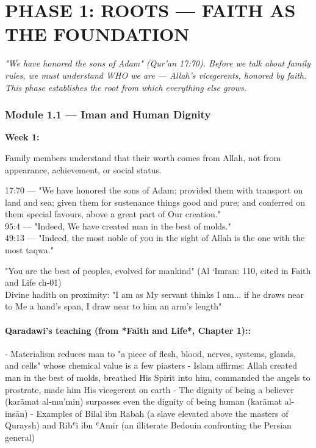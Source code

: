 \documentclass[11pt,a4paper]{article}
\begin{document}
\vspace{6pt}\noindent{\color{border}\rule{\textwidth}{0.5pt}}\vspace{6pt}

\newpage
\section{PHASE 1: ROOTS --- FAITH AS THE FOUNDATION}

\begin{quotebox}\itshape "We have honored the sons of Adam" (Qur'an 17:70). Before we talk about family rules, we must understand WHO we are --- Allah's vicegerents, honored by faith. This phase establishes the root from which everything else grows.\end{quotebox}

\subsubsection*{Module 1.1 --- Iman and Human Dignity}
\textbf{Week 1:} 

\begin{outcomebox} Family members understand that their worth comes from Allah, not from appearance, achievement, or social status. \end{outcomebox}

\begin{quranbox} 17:70 --- "We have honored the sons of Adam; provided them with transport on land and sea; given them for sustenance things good and pure; and conferred on them special favours, above a great part of Our creation." \\ 95:4 --- "Indeed, We have created man in the best of molds." \\ 49:13 --- "Indeed, the most noble of you in the sight of Allah is the one with the most taqwa." \end{quranbox}

\begin{hadithbox} "You are the best of peoples, evolved for mankind" (Al `Imran: 110, cited in Faith and Life ch-01) \\ Divine hadith on proximity: "I am as My servant thinks I am... if he draws near to Me a hand's span, I draw near to him an arm's length" \end{hadithbox}

\paragraph*{Qaradawi's teaching (from *Faith and Life*, Chapter 1)::}  - Materialism reduces man to "a piece of flesh, blood, nerves, systems, glands, and cells" whose chemical value is a few piasters - Islam affirms: Allah created man in the best of molds, breathed His Spirit into him, commanded the angels to prostrate, made him His vicegerent on earth - The dignity of being a believer (karāmat al-mu'min) surpasses even the dignity of being human (karāmat al-insān) - Examples of Bilal ibn Rabah (a slave elevated above the masters of Quraysh) and Ribʿi ibn ʿAmir (an illiterate Bedouin confronting the Persian general)
\end{document}
